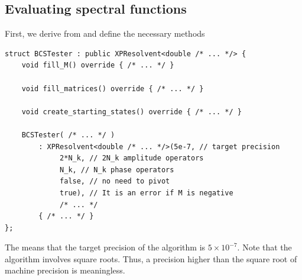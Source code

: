 \documentclass[11pt]{article}
\newcommand{\code}[1]{%
  \texttt{\detokenize{#1}}%
}
\newcommand{\class}[1]{%
  \hyperref[class:#1]{\textcolor{classcolor}{\code{#1}}}%
}
\begin{document}
\subsection{Evaluating spectral functions}

First, we derive from \class{XPResolvent} and define the necessary methods
\begin{lstlisting}
struct BCSTester : public XPResolvent<double /* ... */> {
    void fill_M() override { /* ... */ }
    
    void fill_matrices() override { /* ... */ }
    
    void create_starting_states() override { /* ... */ }
    
    BCSTester( /* ... */ ) 
        : XPResolvent<double /* ... */>(5e-7, // target precision
             2*N_k, // 2N_k amplitude operators
             N_k, // N_k phase operators
             false, // no need to pivot
             true), // It is an error if M is negative 
             /* ... */ 
        { /* ... */ }
};
\end{lstlisting}
The \code{5e-7} means that the target precision of the algorithm is $5 \times 10^{-7}$.
Note that the algorithm involves square roots.
Thus, a precision higher than the square root of machine precision is meaningless.
\end{document}
